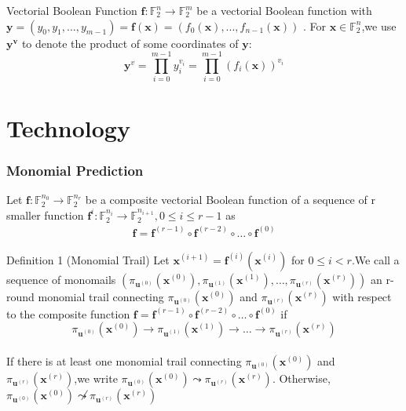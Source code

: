 \documentclass[notheorems, aspectratio=169]{beamer}
\def\bd#1{\boldsymbol{#1}}
\begin{document}
\begin{frame}
    \begin{block}{Vectorial Boolean Function }
        $\boldsymbol{f}:\mathbb{F}^n_2 \rightarrow \mathbb{F}^m_2 $  be a vectorial Boolean function with $\boldsymbol{y} =(y_0,y_1,...,y_{m-1})=\boldsymbol{f}(\boldsymbol{x})=(f_0(\boldsymbol{x}),...,f_{n-1}(\boldsymbol{x}))$ .
        For $\boldsymbol{x}\in \mathbb{F}^n_2 $,we use $\boldsymbol{y}^\boldsymbol{v}$ to denote the product of some coordinates of $\boldsymbol{y}$:
        $$ \boldsymbol{y}^v =\prod^{m-1}_{i=0}y_i^{v_i} =\prod ^{m-1}_{i=0}(f_i(\boldsymbol{x}))^{v_i}$$
    \end{block}   
\end{frame}

\section{Technology}
\begin{frame}
    \frametitle{ Monomial Prediction}
    Let $\boldsymbol{f}:\mathbb{F}^{n_0}_2 \rightarrow \mathbb{F}^{n_r}_2$ be a composite vectorial Boolean function of a sequence of
    r smaller function $\boldsymbol{f}^i:\mathbb{F}^{n_i}_2 \rightarrow \mathbb{F}^{n_{i+1}}_2,0 \le i \le r-1$ as
    \begin{align}
        \boldsymbol{f}=\boldsymbol{f}^{(r-1)} \circ \boldsymbol{f}^{(r-2)} \circ \dots \circ \boldsymbol{f}^{(0)}
    \end{align}
    \begin{block}{Definition 1 (Monomial Trail)}
        Let $\bd{x}^{(i+1)}=\bd{f}^{(i)}(\bd{x}^{(i)})$ for $0\le i<r$.We call a sequence of monomails 
        $(\pi_{\boldsymbol{u}^{(0)}}(\boldsymbol{x}^{(0)}) , \pi_{\boldsymbol{u}^{(1)}}(\boldsymbol{x}^{(1)}) , \dots ,\pi_{\boldsymbol{u}^{(r)}}(\boldsymbol{x}^{(r)}))$
        an r-round monomial trail connecting $\pi_{\boldsymbol{u}^{(0)}}(\boldsymbol{x}^{(0)})$ and
        $\pi_{\boldsymbol{u}^{(r)}}(\boldsymbol{x}^{(r)})$ with respect to the composite function
        $\bd{f}=\bd{f}^{(r-1)}\circ \bd{f}^{(r-2)}\circ \dots \circ \bd{f}^{(0)}$ if
        $$
        \pi_{\boldsymbol{u}^{(0)}}(\boldsymbol{x}^{(0)}) \rightarrow \pi_{\boldsymbol{u}^{(1)}}(\boldsymbol{x}^{(1)}) \rightarrow \dots \rightarrow \pi_{\boldsymbol{u}^{(r)}}(\boldsymbol{x}^{(r)})
        $$
        \\
        If there is at least one monomial trail connecting $\pi_{\boldsymbol{u}^{(0)}}(\boldsymbol{x}^{(0)})$
        and $\pi_{\boldsymbol{u}^{(r)}}(\boldsymbol{x}^{(r)})$,we write 
        $\pi_{\boldsymbol{u}^{(0)}}(\boldsymbol{x}^{(0)})\leadsto \pi_{\boldsymbol{u}^{(r)}}(\boldsymbol{x}^{(r)})$.
        Otherwise,$\pi_{\boldsymbol{u}^{(0)}}(\boldsymbol{x}^{(0)})\not \leadsto \pi_{\boldsymbol{u}^{(r)}}(\boldsymbol{x}^{(r)})$
    \end{block}
\end{frame}
\end{document}
